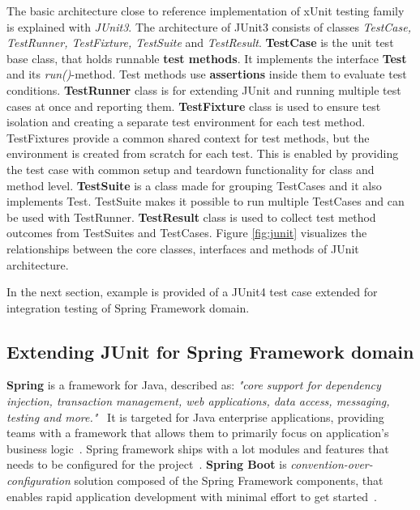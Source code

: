     The basic architecture close to reference implementation of xUnit testing family~\cite{hamill2004unit} is explained with
    \textit{JUnit3}. The architecture of JUnit3 consists of classes \textit{TestCase, TestRunner, TestFixture, TestSuite} and \textit{TestResult}.
    \textbf{TestCase} is the unit test base class, that holds runnable \textbf{test methods}.
    It implements the interface \textbf{Test} and its \textit{run()}-method. Test methods use \textbf{assertions} inside them to evaluate test conditions.
    \textbf{TestRunner} class is for extending JUnit and running multiple test cases at once and reporting
    them. \textbf{TestFixture} class is used to ensure test isolation and creating a separate test environment for each test method.
    TestFixtures provide a common shared context for test methods, but the environment is created from scratch for each test.
    This is enabled by providing the test case with common setup and teardown functionality for class and method level.
    \textbf{TestSuite} is a class made for grouping TestCases and it also implements Test. TestSuite makes it possible to run multiple TestCases and can
    be used with TestRunner. \textbf{TestResult} class is used to collect test method outcomes from TestSuites and TestCases.
    Figure \ref{fig:junit} visualizes the relationships between the core classes, interfaces and methods of JUnit architecture. ~\cite{hamill2004unit}

    In the next section, example is provided of a JUnit4 test case extended for integration testing of Spring Framework domain.

    \subsection{Extending JUnit for Spring Framework domain}
    \label{section:junit-extend}
    \textbf{Spring} is a framework for Java, described as:
    \textit{"core support for dependency injection, transaction management, web applications, data access, messaging, testing and more."}~\cite{spring}
    It is targeted for Java enterprise applications, providing teams with a framework that allows them to primarily focus on
    application's business logic~\cite{spring}. Spring framework ships with a lot modules and features that needs to be
    configured for the project~\cite{wiki:spring}. \textbf{Spring Boot} is \textit{convention-over-configuration} solution
    composed of the Spring Framework components, that enables rapid application development with minimal effort to get started~\cite{wiki:spring}.

